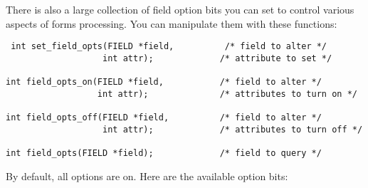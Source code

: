 \label{f0:foptions}There is also a large collection of field option bits you can set to control
various aspects of forms processing.  You can manipulate them with these
functions:
\begin{verbatim} int set_field_opts(FIELD *field,          /* field to alter */
                   int attr);             /* attribute to set */

int field_opts_on(FIELD *field,           /* field to alter */
                  int attr);              /* attributes to turn on */

int field_opts_off(FIELD *field,          /* field to alter */
                   int attr);             /* attributes to turn off */

int field_opts(FIELD *field);             /* field to query */
\end{verbatim}
By default, all options are on.  Here are the available option bits:
